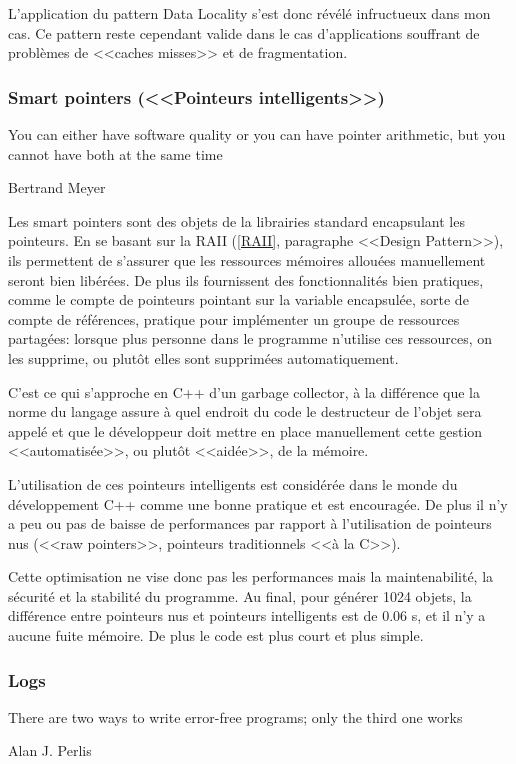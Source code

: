 \documentclass[a4paper,french,12pt]{article}
\begin{document}
	L'application du pattern Data Locality s'est donc révélé infructueux dans mon cas. Ce pattern reste cependant valide
	dans le cas d'applications souffrant de problèmes de <<caches misses>> et de fragmentation.

      \subsubsection{Smart pointers (<<Pointeurs intelligents>>)}
	\epigraph{You can either have software quality or you can have pointer arithmetic, but you cannot have both at the same time}{Bertrand Meyer}


	Les smart pointers sont des objets de la librairies standard encapsulant les pointeurs.
	En se basant sur la RAII (\ref{RAII}, paragraphe <<Design Pattern>>), ils permettent de s'assurer que les ressources mémoires allouées manuellement
	seront bien libérées.
	De plus ils fournissent des fonctionnalités bien pratiques, comme le compte de pointeurs pointant sur la variable encapsulée,
	 sorte de compte de références, pratique pour implémenter un groupe de ressources partagées: lorsque plus personne
	 dans le programme n'utilise ces ressources, on les supprime, ou plutôt elles sont supprimées automatiquement.

	C'est ce qui s'approche en C++ d'un garbage collector, à la différence que la norme du langage assure
	à quel endroit du code le destructeur de l'objet sera appelé et que le développeur doit mettre en place manuellement
	cette gestion <<automatisée>>, ou plutôt <<aidée>>,  de la mémoire.

	L'utilisation de ces pointeurs intelligents est considérée dans le monde du développement C++ comme une bonne
	pratique et est encouragée. De plus il n'y a peu ou pas de baisse de performances par rapport à l'utilisation
	de pointeurs nus (<<raw pointers>>, pointeurs traditionnels <<à la C>>).

	Cette optimisation ne vise donc pas les performances mais la maintenabilité, la sécurité et la stabilité du programme.
	Au final, pour générer 1024 objets, la différence entre pointeurs nus et pointeurs intelligents est de 0.06 s,
	et il n'y a aucune fuite mémoire. De plus le code est plus court et plus simple.


      \subsubsection{Logs}
	\epigraph{There are two ways to write error-free programs; only the third one works}{Alan J. Perlis}
\end{document}
